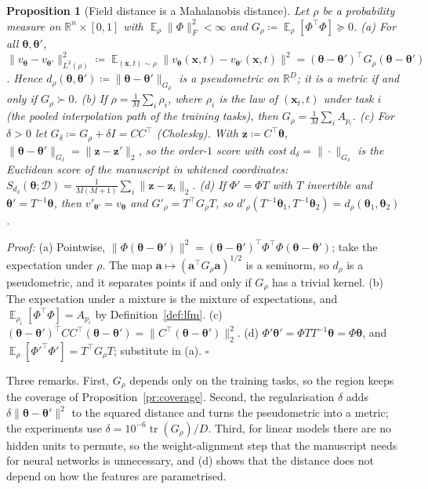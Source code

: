 \documentclass{article}
\DeclareMathOperator{\E}{\mathbb{E}}
\DeclareMathOperator{\tr}{tr}
\newcommand{\RR}{\mathbb{R}}
\newcommand{\cD}{\mathcal{D}}                       %
\newcommand{\bth}{\boldsymbol{\theta}}
\newcommand{\bx}{\mathbf{x}}
\newcommand{\bz}{\mathbf{z}}
\theoremstyle{plain}
\newtheorem{proposition}{Proposition}
\begin{document}
\begin{proposition}[Field distance is a Mahalanobis distance]\label{pr:mahalanobis}
Let $\rho$ be a probability measure on $\RR^n\times[0,1]$ with $\E_\rho\|\Phi\|_F^2<\infty$ and
$G_\rho\coloneqq\E_\rho[\Phi^\top\Phi]\succeq0$.
(a) For all $\bth,\bth'$,
$\|v_{\bth}-v_{\bth'}\|_{L^2(\rho)}^2\coloneqq\E_{(\bx,t)\sim\rho}\|v_{\bth}(\bx,t)-v_{\bth'}(\bx,t)\|^2=(\bth-\bth')^\top G_\rho(\bth-\bth')$.
Hence $d_\rho(\bth,\bth')\coloneqq\|\bth-\bth'\|_{G_\rho}$ is a pseudometric on $\RR^D$; it is a metric if
and only if $G_\rho\succ0$.
(b) If $\rho=\frac1M\sum_i\rho_i$, where $\rho_i$ is the law of $(\bx_t,t)$ under task $i$ (the pooled
interpolation path of the training tasks), then $G_\rho=\frac1M\sum_iA_{p_i}$.
(c) For $\delta>0$ let $G_\delta\coloneqq G_\rho+\delta I=CC^\top$ (Cholesky). With $\bz\coloneqq C^\top\bth$,
$\|\bth-\bth'\|_{G_\delta}=\|\bz-\bz'\|_2$, so the order-$1$ score with cost $d_\delta=\|\cdot\|_{G_\delta}$ is
the Euclidean score of the manuscript in whitened coordinates:
$S_{d_\delta}(\bth;\cD)=\frac{1}{M(M+1)}\sum_i\|\bz-\bz_i\|_2$.
(d) If $\Phi'=\Phi T$ with $T$ invertible and $\bth'=T^{-1}\bth$, then $v'_{\bth'}=v_{\bth}$ and
$G'_\rho=T^\top G_\rho T$, so $d'_\rho(T^{-1}\bth_1,T^{-1}\bth_2)=d_\rho(\bth_1,\bth_2)$.
\end{proposition}
\textit{Proof:}
(a) Pointwise, $\|\Phi(\bth-\bth')\|^2=(\bth-\bth')^\top\Phi^\top\Phi(\bth-\bth')$; take the expectation
under $\rho$. The map $\mathbf{a}\mapsto(\mathbf{a}^\top G_\rho\mathbf{a})^{1/2}$ is a seminorm, so $d_\rho$ is a
pseudometric, and it separates points if and only if $G_\rho$ has a trivial kernel.
(b) The expectation under a mixture is the mixture of expectations, and
$\E_{\rho_i}[\Phi^\top\Phi]=A_{p_i}$ by Definition~\ref{def:lfm}.
(c) $(\bth-\bth')^\top CC^\top(\bth-\bth')=\|C^\top(\bth-\bth')\|_2^2$.
(d) $\Phi'\bth'=\Phi TT^{-1}\bth=\Phi\bth$, and $\E_\rho[\Phi'^\top\Phi']=T^\top G_\rho T$; substitute in (a).
\hfill $\square$

Three remarks. First, $G_\rho$ depends only on the training tasks, so the region keeps the
coverage of Proposition~\ref{pr:coverage}. Second, the regularisation $\delta$ adds
$\delta\|\bth-\bth'\|^2$ to the squared distance and turns the pseudometric into a metric; the
experiments use $\delta=10^{-6}\tr(G_\rho)/D$. Third, for linear models there are no hidden
units to permute, so the weight-alignment step that the manuscript needs for neural networks is
unnecessary, and (d) shows that the distance does not depend on how the features are
parametrised.
\end{document}

